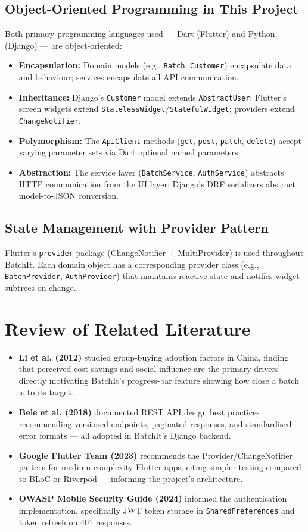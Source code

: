 \documentclass[12pt, a4paper]{report}
\begin{document}
\subsection{Object-Oriented Programming in This Project}
Both primary programming languages used --- Dart (Flutter) and Python (Django) --- are object-oriented:
\begin{itemize}[leftmargin=*]
  \item \textbf{Encapsulation:} Domain models (e.g., \texttt{Batch}, \texttt{Customer}) encapsulate data and behaviour; services encapsulate all API communication.
  \item \textbf{Inheritance:} Django's \texttt{Customer} model extends \texttt{AbstractUser}; Flutter's screen widgets extend \texttt{StatelessWidget}/\texttt{StatefulWidget}; providers extend \texttt{ChangeNotifier}.
  \item \textbf{Polymorphism:} The \texttt{ApiClient} methods (\texttt{get}, \texttt{post}, \texttt{patch}, \texttt{delete}) accept varying parameter sets via Dart optional named parameters.
  \item \textbf{Abstraction:} The service layer (\texttt{BatchService}, \texttt{AuthService}) abstracts HTTP communication from the UI layer; Django's DRF serializers abstract model-to-JSON conversion.
\end{itemize}

\subsection{State Management with Provider Pattern}
Flutter's \texttt{provider} package (ChangeNotifier + MultiProvider) is used throughout BatchIt. Each domain object has a corresponding provider class (e.g., \texttt{BatchProvider}, \texttt{AuthProvider}) that maintains reactive state and notifies widget subtrees on change.

\section{Review of Related Literature}
\begin{itemize}[leftmargin=*]
  \item \textbf{Li et al. (2012)} studied group-buying adoption factors in China, finding that perceived cost savings and social influence are the primary drivers --- directly motivating BatchIt's progress-bar feature showing how close a batch is to its target.
  \item \textbf{Bele et al. (2018)} documented REST API design best practices recommending versioned endpoints, paginated responses, and standardised error formats --- all adopted in BatchIt's Django backend.
  \item \textbf{Google Flutter Team (2023)} recommends the Provider/ChangeNotifier pattern for medium-complexity Flutter apps, citing simpler testing compared to BLoC or Riverpod --- informing the project's architecture.
  \item \textbf{OWASP Mobile Security Guide (2024)} informed the authentication implementation, specifically JWT token storage in \texttt{SharedPreferences} and token refresh on 401 responses.
\end{itemize}
\end{document}
